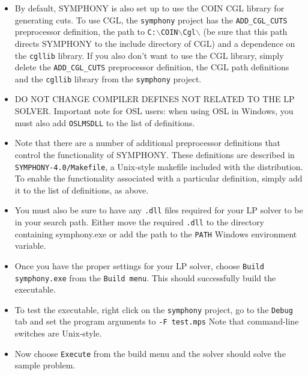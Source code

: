 \begin{itemize}
\begin{itemize}
\end{itemize}

\item By default, SYMPHONY is also set up to use the COIN CGL library for
generating cuts. To use CGL, the \texttt{symphony} project has the
\texttt{ADD\_CGL\_CUTS} preprocessor definition, the path to
\texttt{C:$\backslash$COIN$\backslash$Cgl$\backslash$} (be sure that this path
directs SYMPHONY to the include directory of CGL) and a dependence on the
\texttt{cgllib} library. If you also don't want to use the CGL library, simply
delete the \texttt{ADD\_CGL\_CUTS} preprocessor definition, the CGL path
definitions and the \texttt{cgllib} library from the \texttt{symphony}
project.

\item DO NOT CHANGE COMPILER DEFINES NOT RELATED TO THE LP SOLVER. Important note
for OSL users: when using OSL in Windows, you must also add \texttt{OSLMSDLL}
to the list of definitions.

\item Note that there are a number of additional preprocessor definitions that
control the functionality of SYMPHONY. These definitions are described in
\texttt{SYMPHONY-4.0/Makefile}, a Unix-style makefile included with the
distribution. To enable the functionality associated with a particular
definition, simply add it to the list of definitions, as above.

\item You must also be sure to have any \texttt{.dll} files required for your
LP solver to be in your search path. Either move the required \texttt{.dll} to
the directory containing symphony.exe or add the path to the \texttt{PATH}
Windows environment variable.

\item Once you have the proper settings for your LP solver, choose \texttt{Build
symphony.exe} from the \texttt{Build menu}. This should successfully build
the executable.

\item To test the executable, right click on the \texttt{symphony} project, go
to the \texttt{Debug} tab and set the program arguments to \texttt{-F
test.mps} Note that command-line switches are Unix-style.

\item Now choose \texttt{Execute} from the build menu and the solver
should solve the sample problem.

\end{itemize}

